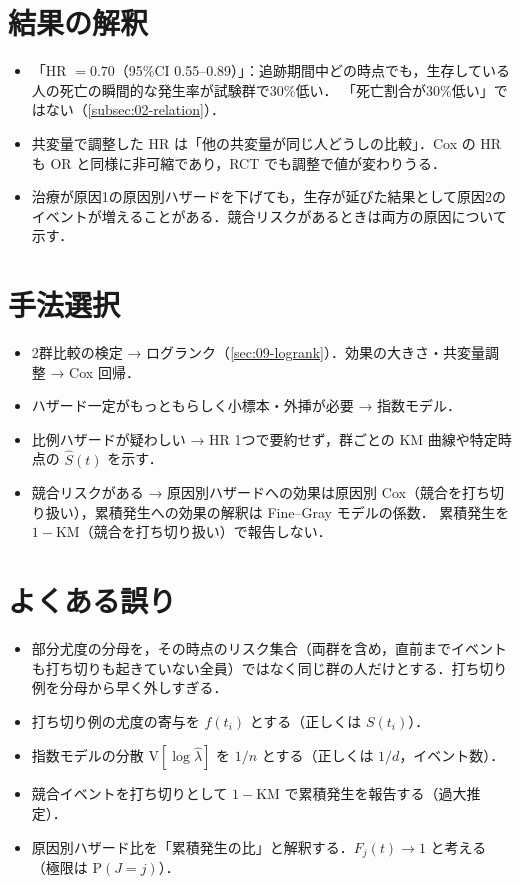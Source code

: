 \documentclass[a4paper,11pt,openany]{ltjsbook}
\newcommand{\V}{\mathrm{V}}
\newcommand{\Prob}{\mathrm{P}}
\begin{document}
\section{結果の解釈}\label{sec:10-interp}
\begin{itemize}
\item 「HR $=0.70$（95\%CI 0.55--0.89）」：追跡期間中どの時点でも，生存している人の死亡の瞬間的な発生率が試験群で30\%低い．
      「死亡割合が30\%低い」ではない（\cref{subsec:02-relation}）．
\item 共変量で調整した HR は「他の共変量が同じ人どうしの比較」．Cox の HR も OR と同様に非可縮であり，RCT でも調整で値が変わりうる．
\item 治療が原因1の原因別ハザードを下げても，生存が延びた結果として原因2のイベントが増えることがある．競合リスクがあるときは両方の原因について示す．
\end{itemize}

\section{手法選択}\label{sec:10-choice}
\begin{itemize}
\item 2群比較の検定 → ログランク（\cref{sec:09-logrank}）．効果の大きさ・共変量調整 → Cox 回帰．
\item ハザード一定がもっともらしく小標本・外挿が必要 → 指数モデル．
\item 比例ハザードが疑わしい → HR 1つで要約せず，群ごとの KM 曲線や特定時点の $\hat S(t)$ を示す．
\item 競合リスクがある → 原因別ハザードへの効果は原因別 Cox（競合を打ち切り扱い），累積発生への効果の解釈は Fine--Gray モデルの係数．
      累積発生を $1-\mathrm{KM}$（競合を打ち切り扱い）で報告しない．
\end{itemize}

\section{よくある誤り}\label{sec:10-err}
\begin{warnbox}
\begin{itemize}
\item 部分尤度の分母を，その時点のリスク集合（両群を含め，直前までイベントも打ち切りも起きていない全員）ではなく同じ群の人だけとする．打ち切り例を分母から早く外しすぎる．
\item 打ち切り例の尤度の寄与を $f(t_i)$ とする（正しくは $S(t_i)$）．
\item 指数モデルの分散 $\V[\log\hat\lambda]$ を $1/n$ とする（正しくは $1/d$，イベント数）．
\item 競合イベントを打ち切りとして $1-\mathrm{KM}$ で累積発生を報告する（過大推定）．
\item 原因別ハザード比を「累積発生の比」と解釈する．$F_j(t)\to1$ と考える（極限は $\Prob(J=j)$）．
\end{itemize}
\end{warnbox}
\end{document}
